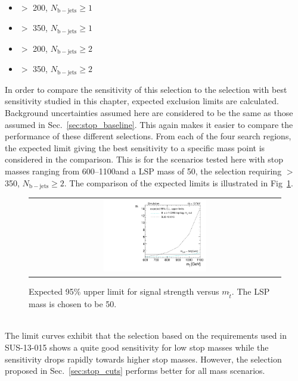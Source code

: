 \begin{itemize}
 \item \met $>$ 200\gev, $N_\mathrm{b-jets} \ge 1$ 
 \item \met $>$ 350\gev, $N_\mathrm{b-jets} \ge 1$ 
 \item \met $>$ 200\gev, $N_\mathrm{b-jets} \ge 2$ 
 \item \met $>$ 350\gev, $N_\mathrm{b-jets} \ge 2$ 
\end{itemize}   
In order to compare the sensitivity of this selection to the selection with best sensitivity studied in this chapter, expected exclusion limits are calculated. Background uncertainties assumed here are considered to be the same as those assumed in Sec.~\ref{sec:stop_baseline}. This again makes it easier to compare the performance of these different selections. From each of the four search regions, the expected limit giving the best sensitivity to a specific mass point is considered in the comparison. This is for the scenarios tested here with stop masses ranging from 600--1100\gev and a LSP mass of 50\gev, the selection requiring \met $>$ 350\gev, $N_\mathrm{b-jets} \ge 2$. The comparison of the expected limits is illustrated in Fig~\ref{fig:stop_baselinetoptagref_limit}. 
\begin{figure}[!h]
  \centering
  \begin{tabular}{c}
                \includegraphics[width=0.42\textwidth]{figures/limitplot4BinSel_BaselineTopTagTransverseMassRef_LSP50.pdf} 
  \end{tabular}
  \caption{Expected 95\% upper limit for signal strength versus $m_{\tilde{t}}$. The LSP mass is chosen to be 50\gev.}
  \label{fig:stop_baselinetoptagref_limit}
\end{figure}
\\
The limit curves exhibit that the selection based on the requirements used in SUS-13-015 shows a quite good sensitivity for low stop masses while the sensitivity drops rapidly towards higher stop masses. However, the selection proposed in Sec.~\ref{sec:stop_cuts} performs better for all mass scenarios.  

